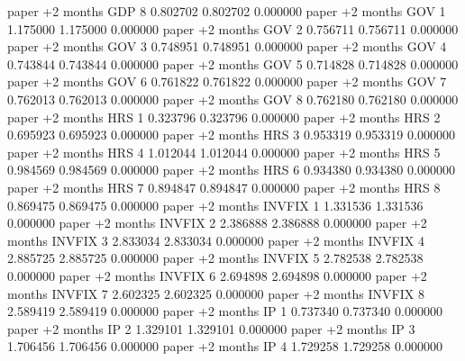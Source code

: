     paper +2 months      GDP                 8 0.802702       0.802702           0.000000
     paper +2 months      GOV                 1 1.175000       1.175000           0.000000
     paper +2 months      GOV                 2 0.756711       0.756711           0.000000
     paper +2 months      GOV                 3 0.748951       0.748951           0.000000
     paper +2 months      GOV                 4 0.743844       0.743844           0.000000
     paper +2 months      GOV                 5 0.714828       0.714828           0.000000
     paper +2 months      GOV                 6 0.761822       0.761822           0.000000
     paper +2 months      GOV                 7 0.762013       0.762013           0.000000
     paper +2 months      GOV                 8 0.762180       0.762180           0.000000
     paper +2 months      HRS                 1 0.323796       0.323796           0.000000
     paper +2 months      HRS                 2 0.695923       0.695923           0.000000
     paper +2 months      HRS                 3 0.953319       0.953319           0.000000
     paper +2 months      HRS                 4 1.012044       1.012044           0.000000
     paper +2 months      HRS                 5 0.984569       0.984569           0.000000
     paper +2 months      HRS                 6 0.934380       0.934380           0.000000
     paper +2 months      HRS                 7 0.894847       0.894847           0.000000
     paper +2 months      HRS                 8 0.869475       0.869475           0.000000
     paper +2 months   INVFIX                 1 1.331536       1.331536           0.000000
     paper +2 months   INVFIX                 2 2.386888       2.386888           0.000000
     paper +2 months   INVFIX                 3 2.833034       2.833034           0.000000
     paper +2 months   INVFIX                 4 2.885725       2.885725           0.000000
     paper +2 months   INVFIX                 5 2.782538       2.782538           0.000000
     paper +2 months   INVFIX                 6 2.694898       2.694898           0.000000
     paper +2 months   INVFIX                 7 2.602325       2.602325           0.000000
     paper +2 months   INVFIX                 8 2.589419       2.589419           0.000000
     paper +2 months       IP                 1 0.737340       0.737340           0.000000
     paper +2 months       IP                 2 1.329101       1.329101           0.000000
     paper +2 months       IP                 3 1.706456       1.706456           0.000000
     paper +2 months       IP                 4 1.729258       1.729258           0.000000

